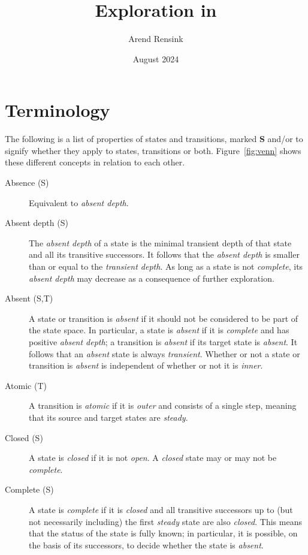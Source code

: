 \documentclass{article}
\begin{document}
\title{Exploration in \GROOVE}
\author{Arend Rensink}
\date{August 2024}
\maketitle

\section*{Terminology}

The following is a list of properties of states and transitions, marked \textbf{S} and/or  to signify whether they apply to states, transitions or both. Figure~\ref{fig:venn} shows these different concepts in relation to each other.

\begin{description}
\item[Absence (S)] Equivalent to \emph{absent depth}.

\item[Absent depth (S)] The \emph{absent depth} of a state is the minimal transient depth of that state and all its transitive successors. It follows that the \emph{absent depth} is smaller than or equal to the \emph{transient depth}. As long as a state is not \emph{complete}, its \emph{absent depth} may decrease as a consequence of further exploration.

\item[Absent (S,T)] A state or transition is \emph{absent} if it should not be considered to be part of the state space. In particular, a state is \emph{absent} if it is \emph{complete} and has positive \emph{absent depth}; a transition is \emph{absent} if its target state is \emph{absent}. It follows that an \emph{absent} state is always \emph{transient}. Whether or not a state or transition is \emph{absent} is independent of whether or not it is \emph{inner}.

\item[Atomic (T)] A transition is \emph{atomic} if it is \emph{outer} and consists of a single step, meaning that its source and target states are \emph{steady}.

\item[Closed (S)] A state is \emph{closed} if it is not \emph{open}. A \emph{closed} state may or may not be \emph{complete}.

\item[Complete (S)] A state is \emph{complete} if it is \emph{closed} and all transitive successors up to (but not necessarily including) the first \emph{steady} state are also \emph{closed}. This means that the status of the state is fully known; in particular, it is possible, on the basis of its successors, to decide whether the state is \emph{absent}.


\end{description}
\end{document}
